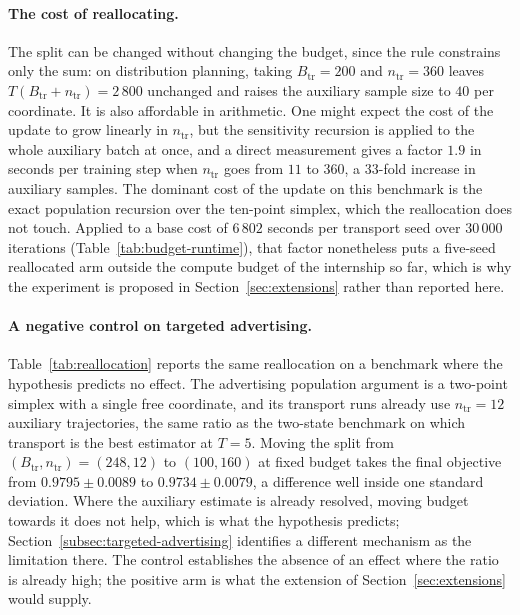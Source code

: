 \paragraph{The cost of reallocating.}
The split can be changed without changing the budget, since the rule constrains only the sum: on distribution planning, taking $B_{\mathrm{tr}}=200$ and $n_{\mathrm{tr}}=360$ leaves $T(B_{\mathrm{tr}}+n_{\mathrm{tr}})=2\,800$ unchanged and raises the auxiliary sample size to $40$ per coordinate. It is also affordable in arithmetic. One might expect the cost of the update to grow linearly in $n_{\mathrm{tr}}$, but the sensitivity recursion is applied to the whole auxiliary batch at once, and a direct measurement gives a factor $1.9$ in seconds per training step when $n_{\mathrm{tr}}$ goes from $11$ to $360$, a $33$-fold increase in auxiliary samples. The dominant cost of the update on this benchmark is the exact population recursion over the ten-point simplex, which the reallocation does not touch. Applied to a base cost of $6\,802$ seconds per transport seed over $30\,000$ iterations (Table~\ref{tab:budget-runtime}), that factor nonetheless puts a five-seed reallocated arm outside the compute budget of the internship so far, which is why the experiment is proposed in Section~\ref{sec:extensions} rather than reported here.

\paragraph{A negative control on targeted advertising.}
Table~\ref{tab:reallocation} reports the same reallocation on a benchmark where the hypothesis predicts no effect. The advertising population argument is a two-point simplex with a single free coordinate, and its transport runs already use $n_{\mathrm{tr}}=12$ auxiliary trajectories, the same ratio as the two-state benchmark on which transport is the best estimator at $T=5$. Moving the split from $(B_{\mathrm{tr}},n_{\mathrm{tr}})=(248,12)$ to $(100,160)$ at fixed budget takes the final objective from $0.9795\pm0.0089$ to $0.9734\pm0.0079$, a difference well inside one standard deviation. Where the auxiliary estimate is already resolved, moving budget towards it does not help, which is what the hypothesis predicts; Section~\ref{subsec:targeted-advertising} identifies a different mechanism as the limitation there. The control establishes the absence of an effect where the ratio is already high; the positive arm is what the extension of Section~\ref{sec:extensions} would supply.

